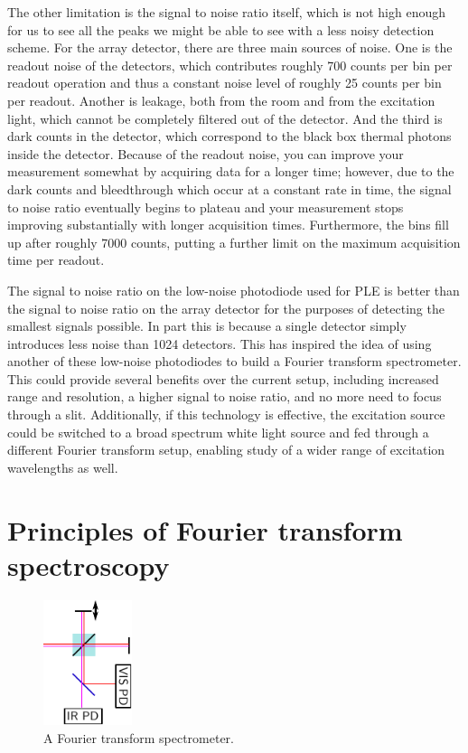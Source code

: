 \documentclass[12pt]{puthesis}
\begin{document}
The other limitation is the signal to noise ratio itself, which is not high enough for us to see all the peaks we might be able to see with a less noisy detection scheme. For the array detector, there are three main sources of noise. One is the readout noise of the detectors, which contributes roughly 700 counts per bin per readout operation and thus a constant noise level of roughly 25 counts per bin per readout. Another is leakage, both from the room and from the excitation light, which cannot be completely filtered out of the detector. And the third is dark counts in the detector, which correspond to the black box thermal photons inside the detector. Because of the readout noise, you can improve your measurement somewhat by acquiring data for a longer time; however, due to the dark counts and bleedthrough which occur at a constant rate in time, the signal to noise ratio eventually begins to plateau and your measurement stops improving substantially with longer acquisition times. Furthermore, the bins fill up after roughly 7000 counts, putting a further limit on the maximum acquisition time per readout.

The signal to noise ratio on the low-noise photodiode used for PLE is better than the signal to noise ratio on the array detector for the purposes of detecting the smallest signals possible. In part this is because a single detector simply introduces less noise than 1024 detectors. This has inspired the idea of using another of these low-noise photodiodes to build a Fourier transform spectrometer. This could provide several benefits over the current setup, including increased range and resolution, a higher signal to noise ratio, and no more need to focus through a slit. Additionally, if this technology is effective, the excitation source could be switched to a broad spectrum white light source and fed through a different Fourier transform setup, enabling study of a wider range of excitation wavelengths as well. 

\section{Principles of Fourier transform spectroscopy}

\begin{figure}
  \centering
  \includegraphics[width=0.23\textwidth]{FTIRMainIdea}
  \caption{A Fourier transform spectrometer.}
  \label{fig:ftirmainidea}
\end{figure}
\end{document}
